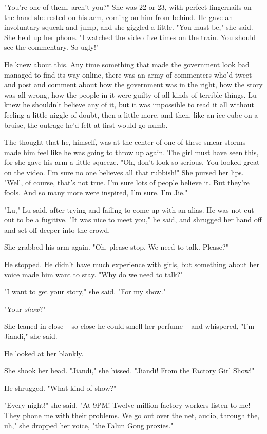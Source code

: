 "You're one of them, aren't you?" She was 22 or 23, with perfect
fingernails on the hand she rested on his arm, coming on him from
behind. He gave an involuntary squeak and jump, and she giggled a
little. "You must be," she said. She held up her phone. "I watched
the video five times on the train. You should see the commentary.
So ugly!"

He knew about this. Any time something that made the government
look bad managed to find its way online, there was an army of
commenters who'd tweet and post and comment about how the
government was in the right, how the story was all wrong, how the
people in it were guilty of all kinds of terrible things. Lu knew
he shouldn't believe any of it, but it was impossible to read it
all without feeling a little niggle of doubt, then a little more,
and then, like an ice-cube on a bruise, the outrage he'd felt at
first would go numb.

The thought that he, himself, was at the center of one of these
smear-storms made him feel like he was going to throw up again. The
girl must have seen this, for she gave his arm a little squeeze.
"Oh, don't look so serious. You looked great on the video. I'm sure
no one believes all that rubbish!" She pursed her lips. "Well, of
course, that's not true. I'm sure lots of people believe it. But
they're fools. And so many more were inspired, I'm sure. I'm Jie."

"Lu," Lu said, after trying and failing to come up with an alias.
He was not cut out to be a fugitive. "It was nice to meet you," he
said, and shrugged her hand off and set off deeper into the crowd.

She grabbed his arm again. "Oh, please stop. We need to talk.
Please?"

He stopped. He didn't have much experience with girls, but
something about her voice made him want to stay. "Why do we need to
talk?"

"I want to get your story," she said. "For my show."

"Your \emph{show}?"

She leaned in close -- so close he could smell her perfume -- and
whispered, "I'm Jiandi," she said.

He looked at her blankly.

She shook her head. "Jiandi," she hissed. "Jiandi! From the Factory
Girl Show!"

He shrugged. "What kind of show?"

"Every night!" she said. "At 9PM! Twelve million factory workers
listen to me! They phone me with their problems. We go out over the
net, audio, through the, uh," she dropped her voice, "the Falun
Gong proxies."

